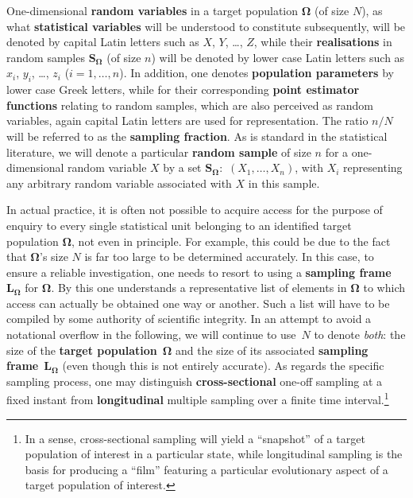 \medskip
\noindent
One-dimensional \textbf{random variables} in a target population 
$\boldsymbol{\Omega}$ (of size $N$), as what \textbf{statistical 
variables} will be understood to constitute subsequently, will be
denoted by capital Latin letters such as $X$, $Y$, \ldots, $Z$,
while their \textbf{realisations} in random samples
$\boldsymbol{S_{\Omega}}$ (of size $n$) will be denoted by lower
case Latin letters such as $x_{i}$, $y_{i}$, \ldots, $z_{i}$
($i=1,\ldots,n$). In addition, one denotes \textbf{population
parameters} by lower case Greek letters, while for their
corresponding \textbf{point estimator functions} relating to random
samples, which are also perceived as random variables, again
capital Latin letters are used for representation. The ratio $n/N$
will be referred to as the \textbf{sampling fraction}. As is
standard in the statistical literature, we will denote a
particular \textbf{random sample} of size $n$ for a one-dimensional
random variable $X$ by a set $\boldsymbol{S_{\Omega}}$:~$(X_{1},
\ldots, X_{n})$, with $X_{i}$ representing any arbitrary random
variable associated with $X$ in this sample.

\medskip
\noindent
In actual practice, it is often not possible to acquire access for 
the purpose of enquiry to every single statistical unit belonging 
to an identified target population $\boldsymbol{\Omega}$, not 
even in principle. For example, this could be due to the fact that 
$\boldsymbol{\Omega}$'s size $N$ is far too large to be determined 
accurately. In this case, to ensure a reliable investigation, one 
needs to resort to using a \textbf{sampling frame} 
$\boldsymbol{L_{\Omega}}$ for $\boldsymbol{\Omega}$. By this one 
understands a representative list of  elements in 
$\boldsymbol{\Omega}$ to which access can actually be obtained one
way or another. Such a list will have to be compiled by some
authority of scientific integrity. In an attempt to avoid a
notational overflow in the following, we will continue to use~$N$
to denote \textit{both}: the size of the \textbf{target 
population}~$\boldsymbol{\Omega}$ and the  size of its associated 
\textbf{sampling frame}~$\boldsymbol{L_{\Omega}}$ (even though this 
is not entirely accurate). As regards the specific sampling
process, one may distinguish \textbf{cross-sectional} one-off
sampling at a fixed instant from \textbf{longitudinal} multiple
sampling over a finite time interval.\footnote{In a sense,
cross-sectional sampling will yield a ``snapshot'' of a target
population of interest in a particular state, while longitudinal
sampling is the basis for producing a ``film'' featuring a
particular evolutionary aspect of a target population of interest.}

